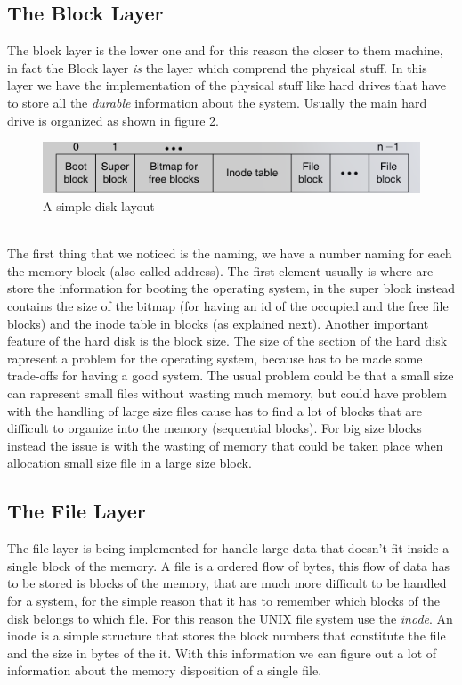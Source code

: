 \documentclass{article}
\begin{document}
    \subsection{The Block Layer}
      The block layer is the lower one and for this reason the closer to them
      machine, in fact the Block layer \textit{is} the layer which comprend the 
      physical stuff. In this layer we have the implementation of the physical
      stuff like hard drives that have to store all the \textit{durable} information
      about the system. Usually the main hard drive is organized as shown in figure 2.
      \begin{figure}[h]
        \centering
        \includegraphics[width=.6\textwidth]{images/disk-layout.png}
        \caption{A simple disk layout}
        \label{fig:mesh2}
      \end{figure}
      \\ The first thing that we noticed is the naming, we have a number naming 
      for each the memory block (also called address). The first element usually is
      where are store the information for booting the operating system, in the super 
      block instead contains the size of the bitmap (for having an id of the occupied 
      and the free file blocks) and the inode table in blocks (as explained next). Another
      important feature of the hard disk is the block size. The size of the section of the 
      hard disk rapresent a problem for the operating system, because has to be made
      some trade-offs for having a good system. The usual problem could be that a small
      size can rapresent small files without wasting much memory, but could have problem
      with the handling of large size files cause has to find a lot of blocks that are 
      difficult to organize into the memory (sequential blocks). For big size blocks 
      instead the issue is with the wasting of memory that could be taken place when 
      allocation small size file in a large size block. 
    \subsection{The File Layer}
      The file layer is being implemented for handle large data that doesn't fit inside 
      a single block of the memory. A file is a ordered flow of bytes, this flow of
      data has to be stored is blocks of the memory, that are much more difficult to be
      handled for a system, for the simple reason that it has to remember which blocks 
      of the disk belongs to which file. For this reason the UNIX file system use the 
      \textit{inode}. An inode is a simple structure that stores the block numbers 
      that constitute the file and the size in bytes of the it. With this information 
      we can figure out a lot of information about the memory disposition of a single 
      file. 
\end{document}
